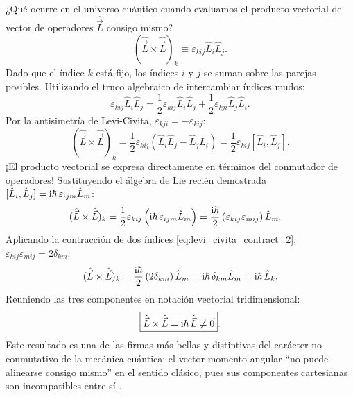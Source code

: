 ¿Qué ocurre en el universo cuántico cuando evaluamos el producto vectorial del vector de operadores $\hat{\vec{L}}$ consigo mismo?
\begin{equation}
    (\hat{\vec{L}} \times \hat{\vec{L}})_k \equiv \varepsilon_{kij}\hat{L}_i\hat{L}_j.
\end{equation}
Dado que el índice $k$ está fijo, los índices $i$ y $j$ se suman sobre las parejas posibles. Utilizando el truco algebraico de intercambiar índices mudos:
\begin{equation}
    \varepsilon_{kij}\hat{L}_i\hat{L}_j = \frac{1}{2}\varepsilon_{kij}\hat{L}_i\hat{L}_j + \frac{1}{2}\varepsilon_{kji}\hat{L}_j\hat{L}_i.
\end{equation}
Por la antisimetría de Levi-Civita, $\varepsilon_{kji} = -\varepsilon_{kij}$:
\begin{equation}
    (\hat{\vec{L}} \times \hat{\vec{L}})_k = \frac{1}{2}\varepsilon_{kij}(\hat{L}_i\hat{L}_j - \hat{L}_j\hat{L}_i) = \frac{1}{2}\varepsilon_{kij}[\hat{L}_i, \hat{L}_j].
\end{equation}
¡El producto vectorial se expresa directamente en términos del conmutador de operadores! Sustituyendo el álgebra de Lie recién demostrada $[\hat{L}_i, \hat{L}_j] = \mathrm{i}\hbar\,\varepsilon_{ijm}\hat{L}_m$:
\begin{align}
    (\hat{\vec{L}} \times \hat{\vec{L}})_k &= \frac{1}{2}\varepsilon_{kij}\left( \mathrm{i}\hbar\,\varepsilon_{ijm}\hat{L}_m \right) = \frac{\mathrm{i}\hbar}{2}\left( \varepsilon_{kij}\varepsilon_{mij} \right)\hat{L}_m.
\end{align}
Aplicando la contracción de dos índices \eqref{eq:levi_civita_contract_2}, $\varepsilon_{kij}\varepsilon_{mij} = 2\delta_{km}$:
\begin{equation}
    (\hat{\vec{L}} \times \hat{\vec{L}})_k = \frac{\mathrm{i}\hbar}{2}\left( 2\delta_{km} \right)\hat{L}_m = \mathrm{i}\hbar\,\delta_{km}\hat{L}_m = \mathrm{i}\hbar\,\hat{L}_k.
\end{equation}
Reuniendo las tres componentes en notación vectorial tridimensional:
\begin{equation}
    \boxed{\hat{\vec{L}} \times \hat{\vec{L}} = \mathrm{i}\hbar\,\hat{\vec{L}} \neq \vec{0}}.
    \label{eq:quantum_cross_product}
\end{equation}
Este resultado es una de las firmas más bellas y distintivas del carácter no conmutativo de la mecánica cuántica: el vector momento angular \enquote{no puede alinearse consigo mismo} en el sentido clásico, pues sus componentes cartesianas son incompatibles entre sí \cite{sakurai}.

